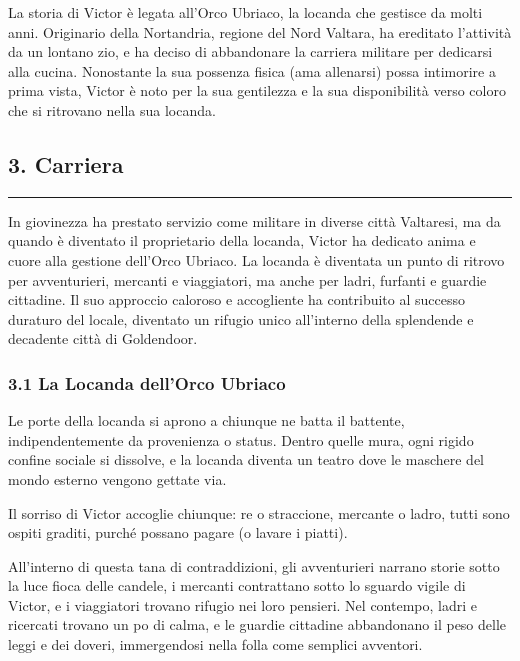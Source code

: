 La storia di Victor è legata all'Orco Ubriaco, la locanda che gestisce
da molti anni. Originario della Nortandria, regione del Nord Valtara, ha
ereditato l'attività da un lontano zio, e ha deciso di abbandonare la
carriera militare per dedicarsi alla cucina. Nonostante la sua possenza
fisica (ama allenarsi) possa intimorire a prima vista, Victor è noto per
la sua gentilezza e la sua disponibilità verso coloro che si ritrovano
nella sua locanda.

\subsection{3. Carriera}\label{carriera}

\begin{center}\rule{0.5\linewidth}{0.5pt}\end{center}

In giovinezza ha prestato servizio come militare in diverse città
Valtaresi, ma da quando è diventato il proprietario della locanda,
Victor ha dedicato anima e cuore alla gestione dell'Orco Ubriaco. La
locanda è diventata un punto di ritrovo per avventurieri, mercanti e
viaggiatori, ma anche per ladri, furfanti e guardie cittadine. Il suo
approccio caloroso e accogliente ha contribuito al successo duraturo del
locale, diventato un rifugio unico all'interno della splendende e
decadente città di Goldendoor.

\subsubsection{3.1 La Locanda dell'Orco
Ubriaco}\label{la-locanda-dellorco-ubriaco}

Le porte della locanda si aprono a chiunque ne batta il battente,
indipendentemente da provenienza o status. Dentro quelle mura, ogni
rigido confine sociale si dissolve, e la locanda diventa un teatro dove
le maschere del mondo esterno vengono gettate via.

Il sorriso di Victor accoglie chiunque: re o straccione, mercante o
ladro, tutti sono ospiti graditi, purché possano pagare (o lavare i
piatti).

All'interno di questa tana di contraddizioni, gli avventurieri narrano
storie sotto la luce fioca delle candele, i mercanti contrattano sotto
lo sguardo vigile di Victor, e i viaggiatori trovano rifugio nei loro
pensieri. Nel contempo, ladri e ricercati trovano un po di calma, e le
guardie cittadine abbandonano il peso delle leggi e dei doveri,
immergendosi nella folla come semplici avventori.

